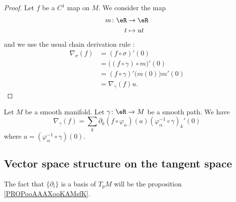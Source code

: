 \begin{proof}
	Let \( f\) be a \( C^1\) map on \( M\). We consider the map
	\begin{equation}
		\begin{aligned}
			m\colon \eR & \to \eR    \\
			t           & \mapsto ut
		\end{aligned}
	\end{equation}
	and we use the usual chain derivation rule :
	\begin{subequations}
		\begin{align}
			\nabla_{\sigma}(f) & =(f\circ\sigma)'(0)                    \\
			                   & =\Big( (f\circ\gamma)\circ m \Big)'(0) \\
			                   & =(f\circ\gamma)'\big( m(0) \big)m'(0)  \\
			                   & =\nabla_{\gamma}(f)u.
		\end{align}
	\end{subequations}
\end{proof}


\begin{proposition}	\label{PROPooMJKEooLvsYjl}
	Let \( M\) be a smooth manifold. Let \(\gamma \colon \eR\to M  \) be a smooth path. We have
	\begin{equation}
		\nabla_{\gamma}(f)=\sum_k\partial_k(f\circ\varphi_{\alpha})(a)(\varphi_{\alpha}^{-1}\circ\gamma)_k'(0)
	\end{equation}
	where \( a=(\varphi_{\alpha}^{-1}\circ\gamma)(0)\).
\end{proposition}



\subsection{Vector space structure on the tangent space}

The fact that \( \{ \partial_i \}\) is a basis of \( T_pM\) will be the proposition \ref{PROPooAAAXooKAMsfK}.

